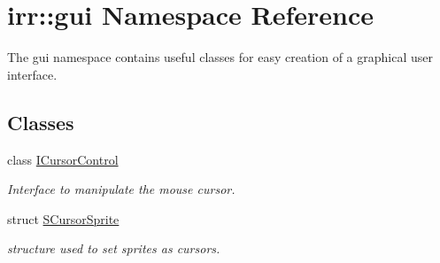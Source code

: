 \hypertarget{namespaceirr_1_1gui}{}\section{irr\+:\+:gui Namespace Reference}
\label{namespaceirr_1_1gui}


The gui namespace contains useful classes for easy creation of a graphical user interface.  


\subsection*{Classes}
\begin{DoxyCompactItemize}
\item 
class \hyperlink{classirr_1_1gui_1_1ICursorControl}{I\+Cursor\+Control}
\begin{DoxyCompactList}\small\item\em Interface to manipulate the mouse cursor. \end{DoxyCompactList}\item 
struct \hyperlink{structirr_1_1gui_1_1SCursorSprite}{S\+Cursor\+Sprite}
\begin{DoxyCompactList}\small\item\em structure used to set sprites as cursors. \end{DoxyCompactList}\end{DoxyCompactItemize}
